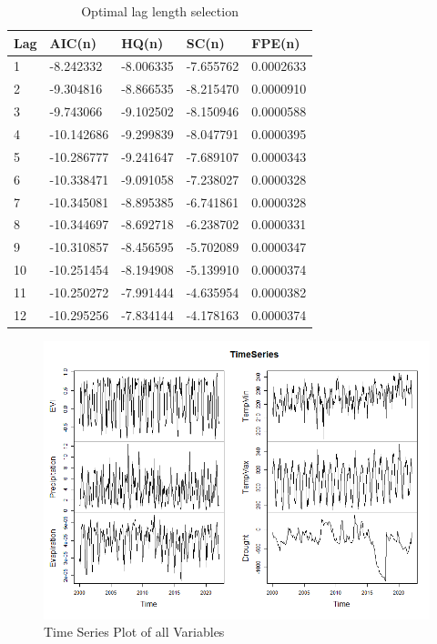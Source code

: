 \begin{table}[]
	\label{table:Optimal lag}
	\caption{Optimal lag length selection}
	\centering
	\addtolength{\tabcolsep}{25pt}
	\begin{tabularx}{\textwidth}{@{}lllll@{}}
		\toprule
	 Lag  &	AIC(n)&	HQ(n)&	SC(n)&	FPE(n)\\\midrule
	1&	-8.242332&	-8.006335&	-7.655762&	0.0002633\\
	2&	-9.304816&	-8.866535&	-8.215470&	0.0000910\\
	3&	-9.743066&	-9.102502&	-8.150946&	0.0000588\\
	4&	-10.142686&	-9.299839&	-8.047791&	0.0000395\\
	5&	-10.286777&	-9.241647&	-7.689107&	0.0000343\\
	6&	-10.338471&	-9.091058&	-7.238027&	0.0000328\\
	7&	-10.345081&	-8.895385&	-6.741861&	0.0000328\\
	8&	-10.344697&	-8.692718&	-6.238702&	0.0000331\\
	9&	-10.310857&	-8.456595&	-5.702089&	0.0000347\\
	10&	-10.251454&	-8.194908&	-5.139910&	0.0000374\\
	11&	-10.250272&	-7.991444&	-4.635954&	0.0000382\\
	12&	-10.295256&	-7.834144&	-4.178163&	0.0000374\\
		 \bottomrule
	\end{tabularx}
\end{table}
\begin{figure}
	\centering
	\includegraphics[width=0.9\linewidth]{images/TimeSeries}
	\caption{Time Series Plot of all Variables}
	\label{fig:TimeSeries}
\end{figure}
